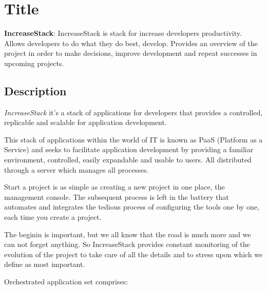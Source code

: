 \documentclass[11pt]{scrartcl}
\begin{document}
\section{Title}

\textbf{IncreaseStack}: IncreaseStack is stack for increase developers productivity. Allows developers to do what they do best, develop. Provides an overview of the project in order to make decisions, improve development and repeat successes in upcoming projects.

\subsection{Description}

\emph{IncreaseStack} it's a stack of applications for developers that provides a controlled, replicable and scalable for application development. 

\par This stack of applications within the world of IT is known as PaaS (Platform as a Service) and seeks to facilitate application development by providing a familiar environment, controlled, easily expandable and usable to users. All distributed through a server which manages all processes.

\par Start a project is as simple as creating a new project in one place, the management console. The subsequent process is left in the battery that automates and integrates the tedious process of configuring the tools one by one, each time you create a project.

\par The beginin is important, but we all know that the road is much more and we can not forget anything. So IncreaseStack provides constant monitoring of the evolution of the project to take care of all the details and to stress upon which we define as most important.

\par Orchestrated application set comprises:
\end{document}
